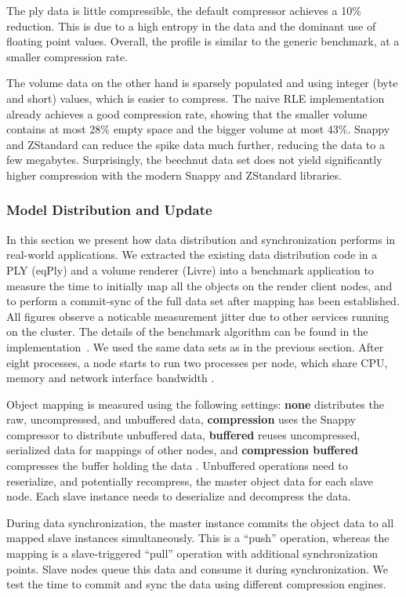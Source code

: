 \documentclass[10pt,journal,compsoc]{IEEEtran}
\newcommand{\FIXME}[1]{\textbf{\color{BLUE}{FIXME: #1}}}
\begin{document}
The ply data is little compressible, the default compressor achieves a 10\%
reduction. This is due to a high entropy in the data and the dominant use of
floating point values. Overall, the profile is similar to the generic benchmark,
at a smaller compression rate.

The volume data on the other hand is sparsely populated and using integer (byte
and short) values, which is easier to compress. The naive RLE implementation
already achieves a good compression rate, showing that the smaller volume contains at
most 28\% empty space and the bigger volume at most 43\%. Snappy and ZStandard
can reduce the spike data much further, reducing the data to a few megabytes.
Surprisingly, the beechnut data set does not yield significantly higher
compression with the modern Snappy and ZStandard libraries.


\subsubsection{Model Distribution and Update}

In this section we present how data distribution and synchronization performs in
real-world applications. We extracted the existing data distribution code in a
PLY (eqPly) and a volume renderer (Livre) into a benchmark application to
measure the time to initially map all the objects on the render client nodes,
and to perform a commit-sync of the full data set after mapping has been
established. All figures observe a noticable measurement jitter due to other
services running on the cluster. The details of the benchmark algorithm can be
found in the implementation~\cite{eqObjectBench}. We used the same data sets as
in the previous section. After eight processes, a node starts to run two
processes per node, which share CPU, memory and network interface bandwidth \FIXME{unclear}.

Object mapping is measured using the following settings: \textbf{none}
distributes the raw, uncompressed, and unbuffered data, \textbf{compression}
uses the Snappy compressor to distribute unbuffered data, \textbf{buffered}
reuses uncompressed, serialized data for mappings of other nodes, and
\textbf{compression buffered} compresses the buffer holding the data \FIXME{unclear}. Unbuffered operations need
to reserialize, and potentially recompress, the master object data for each
slave node. Each slave instance needs to deserialize and decompress the data.

During data synchronization, the master instance commits the object data to all
mapped slave instances simultaneously. This is a ``push'' operation, whereas the
mapping is a slave-triggered ``pull'' operation with additional synchronization
points. Slave nodes queue this data and consume it during synchronization. We
test the time to commit and sync the data using different compression engines.
\end{document}
